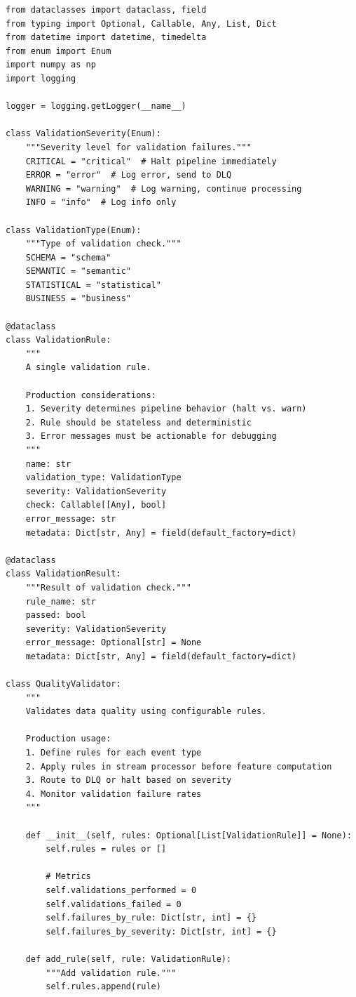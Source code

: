 \begin{lstlisting}[style=python, caption={Quality Validation Rules}]
from dataclasses import dataclass, field
from typing import Optional, Callable, Any, List, Dict
from datetime import datetime, timedelta
from enum import Enum
import numpy as np
import logging

logger = logging.getLogger(__name__)

class ValidationSeverity(Enum):
    """Severity level for validation failures."""
    CRITICAL = "critical"  # Halt pipeline immediately
    ERROR = "error"  # Log error, send to DLQ
    WARNING = "warning"  # Log warning, continue processing
    INFO = "info"  # Log info only

class ValidationType(Enum):
    """Type of validation check."""
    SCHEMA = "schema"
    SEMANTIC = "semantic"
    STATISTICAL = "statistical"
    BUSINESS = "business"

@dataclass
class ValidationRule:
    """
    A single validation rule.

    Production considerations:
    1. Severity determines pipeline behavior (halt vs. warn)
    2. Rule should be stateless and deterministic
    3. Error messages must be actionable for debugging
    """
    name: str
    validation_type: ValidationType
    severity: ValidationSeverity
    check: Callable[[Any], bool]
    error_message: str
    metadata: Dict[str, Any] = field(default_factory=dict)

@dataclass
class ValidationResult:
    """Result of validation check."""
    rule_name: str
    passed: bool
    severity: ValidationSeverity
    error_message: Optional[str] = None
    metadata: Dict[str, Any] = field(default_factory=dict)

class QualityValidator:
    """
    Validates data quality using configurable rules.

    Production usage:
    1. Define rules for each event type
    2. Apply rules in stream processor before feature computation
    3. Route to DLQ or halt based on severity
    4. Monitor validation failure rates
    """

    def __init__(self, rules: Optional[List[ValidationRule]] = None):
        self.rules = rules or []

        # Metrics
        self.validations_performed = 0
        self.validations_failed = 0
        self.failures_by_rule: Dict[str, int] = {}
        self.failures_by_severity: Dict[str, int] = {}

    def add_rule(self, rule: ValidationRule):
        """Add validation rule."""
        self.rules.append(rule)


\end{lstlisting}
